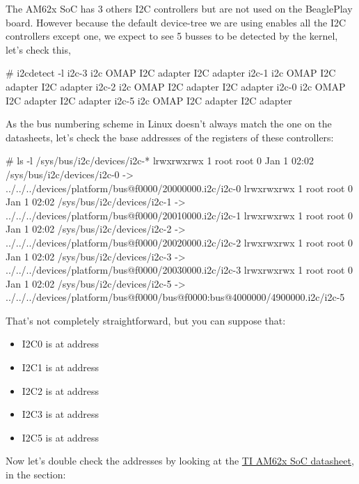 The AM62x SoC has 3 others I2C controllers but are not used on
the BeaglePlay board. However because the default device-tree
we are using enables all the I2C controllers except one, we expect
to see 5 busses to be detected by the kernel, let's check this,

\begin{bashinput}
# i2cdetect -l
i2c-3	i2c       	OMAP I2C adapter                	I2C adapter
i2c-1	i2c       	OMAP I2C adapter                	I2C adapter
i2c-2	i2c       	OMAP I2C adapter                	I2C adapter
i2c-0	i2c       	OMAP I2C adapter                	I2C adapter
i2c-5	i2c       	OMAP I2C adapter                	I2C adapter
\end{bashinput}

As the bus numbering scheme in Linux doesn't always match the one
on the datasheets, let's check the base addresses of the registers
of these controllers:

\begin{bashinput}
# ls -l /sys/bus/i2c/devices/i2c-*
lrwxrwxrwx    1 root     root             0 Jan  1 02:02 /sys/bus/i2c/devices/i2c-0 -> ../../../devices/platform/bus@f0000/20000000.i2c/i2c-0
lrwxrwxrwx    1 root     root             0 Jan  1 02:02 /sys/bus/i2c/devices/i2c-1 -> ../../../devices/platform/bus@f0000/20010000.i2c/i2c-1
lrwxrwxrwx    1 root     root             0 Jan  1 02:02 /sys/bus/i2c/devices/i2c-2 -> ../../../devices/platform/bus@f0000/20020000.i2c/i2c-2
lrwxrwxrwx    1 root     root             0 Jan  1 02:02 /sys/bus/i2c/devices/i2c-3 -> ../../../devices/platform/bus@f0000/20030000.i2c/i2c-3
lrwxrwxrwx    1 root     root             0 Jan  1 02:02 /sys/bus/i2c/devices/i2c-5 -> ../../../devices/platform/bus@f0000/bus@f0000:bus@4000000/4900000.i2c/i2c-5
\end{bashinput}

That's not completely straightforward, but you can suppose that:
\begin{itemize}
\item I2C0 is at address 
\item I2C1 is at address 
\item I2C2 is at address 
\item I2C3 is at address 
\item I2C5 is at address 
\end{itemize}

Now let's double check the addresses by looking at the
\href{https://www.ti.com/lit/ug/spruiv7a/spruiv7a.pdf}{TI AM62x SoC
datasheet}, in the  section:


